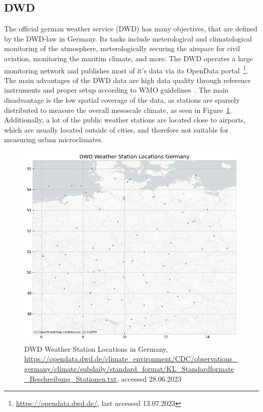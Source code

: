 \subsection{DWD}

The official german weather service (DWD) has many objectives, that are defined by the DWD-law in Germany. Its tasks include meterological and climatological monitoring of the atmosphere, meterologically securing the airspace for civil aviation, monitoring the maritim climate, and more. The DWD operates a large monitoring network and publishes most of it's data via its OpenData portal~\footnote{\url{https://opendata.dwd.de/}, last accessed 13.07.2023}.\\
The main advantages of the DWD data are high data quality through reference instruments and proper setup according to WMO guidelines~\cite{wmo2018guide}. The main disadvantage is the low spatial coverage of the data, as stations are sparsely distributed to measure the overall mesoscale climate, as seen in Figure~\ref{fig:dwd sensor locations germany}. Additionally, a lot of the public weather stations are located close to airports, which are usually located outside of cities, and therefore not suitable for measuring urban microclimates.

\begin{figure}[ht]
    \centering
    \includegraphics[width=1\textwidth]{images/dwd_weather_station_locations_germany.png}
    \caption{DWD Weather Station Locations in Germany, \url{https://opendata.dwd.de/climate_environment/CDC/observations_germany/climate/subdaily/standard_format/KL_Standardformate_Beschreibung_Stationen.txt}, accessed 28.06.2023}
    \label{fig:dwd sensor locations germany}
\end{figure}

